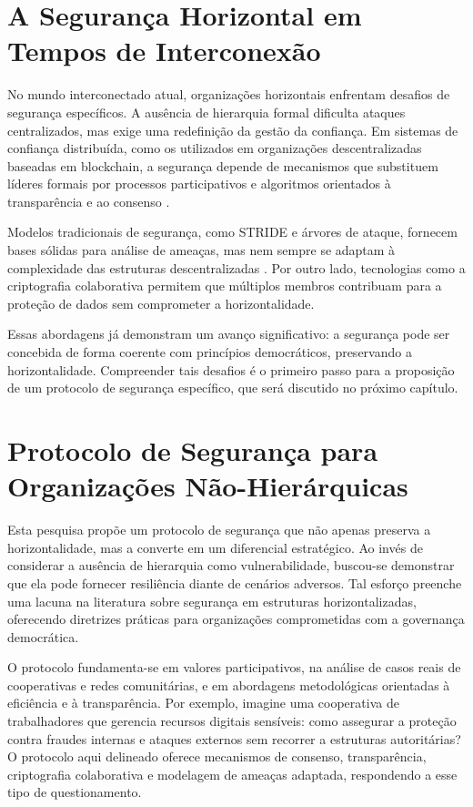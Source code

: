 \section{A Segurança Horizontal em Tempos de Interconexão}
\label{sec:desafios_contemporaneos}

No mundo interconectado atual, organizações horizontais
enfrentam desafios de segurança específicos. A ausência de
hierarquia formal dificulta ataques centralizados, mas exige
uma redefinição da gestão da confiança. Em sistemas de
confiança distribuída, como os utilizados em organizações
descentralizadas baseadas em blockchain, a segurança depende
de mecanismos que substituem líderes formais por processos
participativos e algoritmos orientados à transparência e ao
consenso \cite{Reputation-basedDAO}.

Modelos tradicionais de segurança, como STRIDE e árvores de
ataque, fornecem bases sólidas para análise de ameaças, mas
nem sempre se adaptam à complexidade das estruturas
descentralizadas \cite{ThreatModellingSurvey}. Por outro
lado, tecnologias como a criptografia colaborativa
\cite{Colbac, AbcCrypto} permitem que múltiplos membros
contribuam para a proteção de dados sem comprometer a
horizontalidade.

Essas abordagens já demonstram um avanço significativo: a
segurança pode ser concebida de forma coerente com
princípios democráticos, preservando a horizontalidade.
Compreender tais desafios é o primeiro passo para a
proposição de um protocolo de segurança específico, que será
discutido no próximo capítulo.

\section{Protocolo de Segurança para Organizações
Não-Hierárquicas} \label{sec:objetivos_pesquisa}

Esta pesquisa propõe um protocolo de segurança que não
apenas preserva a horizontalidade, mas a converte em um
diferencial estratégico. Ao invés de considerar a ausência
de hierarquia como vulnerabilidade, buscou-se demonstrar que
ela pode fornecer resiliência diante de cenários adversos.
Tal esforço preenche uma lacuna na literatura sobre
segurança em estruturas horizontalizadas, oferecendo
diretrizes práticas para organizações comprometidas com a
governança democrática.

O protocolo fundamenta-se em valores participativos, na
análise de casos reais de cooperativas e redes comunitárias,
e em abordagens metodológicas orientadas à eficiência e à
transparência. Por exemplo, imagine uma cooperativa de
trabalhadores que gerencia recursos digitais sensíveis: como
assegurar a proteção contra fraudes internas e ataques
externos sem recorrer a estruturas autoritárias? O protocolo
aqui delineado oferece mecanismos de consenso,
transparência, criptografia colaborativa e modelagem de
ameaças adaptada, respondendo a esse tipo de questionamento.

